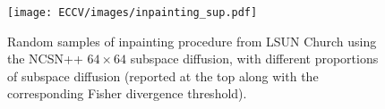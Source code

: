 \documentclass{article}
\begin{document}
\begin{figure}
    \centering
    \texttt{[image: ECCV/images/inpainting\_sup.pdf]}
    \caption{Random samples of inpainting procedure from LSUN Church using the NCSN++ $64\times 64$ subspace diffusion, with different proportions of subspace diffusion (reported at the top along with the corresponding Fisher divergence threshold).  }
    \label{fig:inpainting}
\end{figure}
\end{document}
